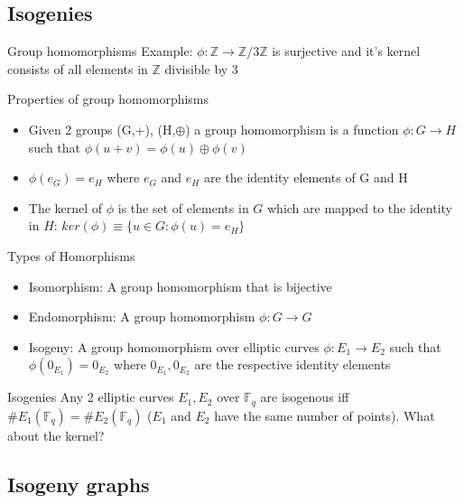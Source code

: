\documentclass{beamer}
\begin{document}
\subsection{Isogenies}
\begin{frame}{Group homomorphisms}
	Example: $\phi: \mathbb{Z}\to\mathbb{Z}/3\mathbb{Z}$ is surjective and it's kernel consists of all elements in $\mathbb{Z}$ divisible by 3
	
	\begin{block}{Properties of group homomorphisms}
		
		\begin{itemize}
			\item Given 2 groups (G,+), (H,$\oplus$) a group homomorphism is a function $\phi: G \to H$ such that $\phi(u + v) = \phi(u) \oplus \phi(v)$ 
			\item $\phi(e_G) = e_H$ where $e_G$ and $e_H$ are the identity elements of G and H
			\item The kernel of $\phi$ is the set of elements in $G$ which are mapped to the identity in $H$:
			$ker(\phi) \equiv \{u\in G:\phi(u)=e_H\}$
		\end{itemize}
	\end{block}
\end{frame}
\begin{frame}{Types of Homorphisms}
	\begin{itemize}
		\item Isomorphism: A group homomorphism that is bijective %
		\item Endomorphism: A group homomorphism $\phi: G \to G$
		\item Isogeny: A group homomorphism over elliptic curves $\phi : E_1 \to E_2$ such that $\phi(0_{E_1}) = 0_{E_2}$ where $0_{E_1},0_{E_2}$ are the respective identity elements
	\end{itemize}

\begin{block}{Isogenies}
	Any 2 elliptic curves $E_1,E_2$ over $\mathbb{F}_q$ are isogenous iff $\#E_1(\mathbb{F}_q) = \#E_2(\mathbb{F}_q)$ ($E_1$ and $E_2$ have the same number of points). What about the kernel?
\end{block}

\end{frame}

\subsection{Isogeny graphs}
\end{document}
